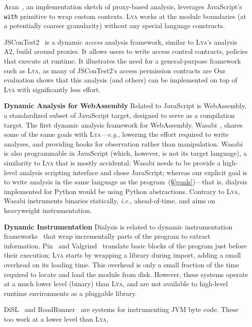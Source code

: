 \documentclass[letterpaper,twocolumn,10pt]{article}
\def\eg{{\em e.g.}, }
\def\ie{{\em i.e.}, }
\newcommand{\heading}[1]{\vspace{2pt}\noindent\textbf{#1}\enspace}
\newcommand{\ttt}[1]{\texttt{#1}}
\newcommand{\sx}[1]{(\S\ref{#1})}
\newcommand{\sys}{{\scshape Lya}\xspace}
\newcommand{\fixme}[1]{{\color{red}#1}}
\begin{document}
Aran~\cite{javascript1}, an implementation sketch of proxy-based analysis, leverages JavaScript's \ttt{with} primitive to wrap custom contexts.
\sys works at the module boundaries (at a potentially coarser granularity) without any special language constructs.

JSConTest2~\cite{javascript2} is a dynamic \emph{access} analysis framework, similar to \sys's analysis \fixme{A2}, build around proxies.
It allows users to write access control contracts, policies that execute at runtime.
It illustrates the need for a general-purpose framework such as \sys, as many of JSConTest2's access permission contracts are 
Our evaluation shows that this analysis (and others) can be implemented on top of \sys with significantly less effort.


\heading{Dynamic Analysis for WebAssembly}
Related to JavaScript is WebAssembly, a standardized subset of JavaScript target, designed to serve as a compilation target.
The first dynamic analysis framework for WebAssembly, Wasabi~\cite{wasabi}, shares some of the same goals with \sys---\eg lowering the effort required to write analyses, and providing hooks for observation rather than manipulation.
Wasabi is also programmable in JavaScript (which, however, is not its target language), a similarity to \sys that is mostly accidental:
  Wasabi needs to be provide a high-level analysis scripting interface and chose JavaScript;
  whereas our explicit goal is to write analysis in the same language as the program~\sx{goals}---that is, dialysis implemented for Python would be using Python abstractions.
Contrary to \sys, Wasabi instruments binaries statically, \ie ahead-of-time, and aims on heavyweight instrumentation.



\heading{Dynamic Instrumentation}
Dialysis is related to dynamic instrumentation frameworks~\cite{pin, valgrind} that wrap incrementally parts of the program to extract information.
Pin~\cite{pin} and Valgrind~\cite{valgrind} translate basic blocks of the program just before their execution;
  \sys starts by wrapping a library during import, adding a small overhead on its loading time.
This overhead is only a small fraction of the time required to locate and load the module from disk.
However, these systems operate at a much lower level (binary) than \sys, and are not available to high-level runtime environments as a pluggable library.

DiSL~\cite{disl} and RoadRunner~\cite{roadrunner} are systems for instrumenting JVM byte code.
These too work at a lower level than \sys, 
\end{document}
